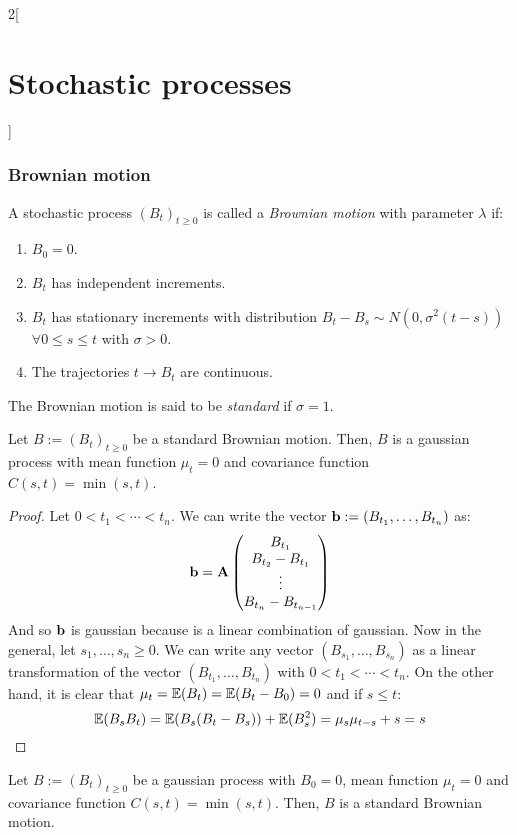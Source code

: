 \documentclass[../../../main_math.tex]{subfiles}
\begin{document}
\begin{multicols}{2}[\section{Stochastic processes}]
  \subsubsection{Brownian motion}
  \begin{definition}
    A stochastic process ${(B_t)}_{t\geq 0}$ is called a \emph{Brownian motion} with parameter $\lambda$ if:
    \begin{enumerate}
      \item $B_0=0$.
      \item $B_t$ has independent increments.
      \item $B_t$ has stationary increments with distribution $B_t-B_s\sim N(0,\sigma^2(t-s))$ $\forall 0\leq s\leq t$ with $\sigma>0$.
      \item The trajectories $t\to B_t$ are continuous.
    \end{enumerate}
    The Brownian motion is said to be \emph{standard} if $\sigma=1$.
  \end{definition}
  \begin{proposition}
    Let $B:={(B_t)}_{t\geq 0}$ be a standard Brownian motion. Then, $B$ is a gaussian process with mean function $\mu_t=0$ and covariance function $C(s,t)=\min(s,t)$.
  \end{proposition}
  \begin{proof}
    Let $0< t_1<\cdots<t_n$. We can write the vector $\boldsymbol{\mathrm{b}}:=(B_{t_1},\ldots,B_{t_n})$ as:
    $$
      \boldsymbol{\mathrm{b}}=\boldsymbol{\mathrm{A}}\begin{pmatrix}
        B_{t_1}           \\
        B_{t_2} - B_{t_1} \\
        \vdots            \\
        B_{t_n} - B_{t_{n-1}}
      \end{pmatrix}
    $$
    And so $\boldsymbol{\mathrm{b}}$ is gaussian because is a linear combination of gaussian. Now in the general, let $s_1, \ldots, s_n\geq 0$. We can write any vector $(B_{s_1}, \ldots, B_{s_n})$ as a linear transformation of the vector $(B_{t_1}, \ldots, B_{t_n})$ with $0< t_1<\cdots<t_n$. On the other hand, it is clear that $\mu_t=\mathbb{E}(B_t)=\mathbb{E}(B_t-B_0)=0$ and if $s\leq t$: $$\mathbb{E}(B_sB_t)=\mathbb{E}(B_s(B_t-B_s))+\mathbb{E}(B_s^2)=\mu_s\mu_{t-s}+s=s$$
  \end{proof}
  \begin{proposition}
    Let $B:={(B_t)}_{t\geq 0}$ be a gaussian process with $B_0=0$, mean function $\mu_t=0$ and covariance function $C(s,t)=\min(s,t)$. Then, $B$ is a standard Brownian motion.
  \end{proposition}

\end{multicols}
\end{document}
